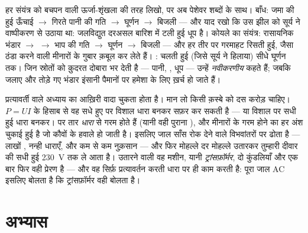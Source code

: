 \begin{example}[शृंखलाओं का लेखा]\label{ex:g9:alternator:chains}
हर संयंत्र को बचपन वाली ऊर्जा-शृंखला की तरह लिखो, पर अब पेशेवर शब्दों
के साथ। बाँध: जमा की हुई ऊँचाई $\to$ गिरते पानी की गति $\to$ घूर्णन
$\to$ बिजली --- और याद रखो कि उस झील को सूर्य ने वाष्पीकरण से उठाया
था: जलविद्युत दरअसल बारिश में टली हुई धूप है। कोयले का संयंत्र:
रासायनिक भंडार $\to$  $\to$ भाप की गति $\to$ घूर्णन $\to$ बिजली
--- और हर तीर पर गरमाहट रिसती हुई, जैसा ठंडा करने वाली मीनारों के
गुबार क़बूल कर लेते हैं। : चलती हुई  (जिसे सूर्य ने हिलाया) सीधे
घूर्णन तक। जिन स्रोतों को क़ुदरत दोबारा भर देती है --- पानी, , धूप
--- उन्हें \emph{नवीकरणीय} कहते हैं; जबकि जलाए और तोड़े
गए भंडार इंसानी पैमानों पर हमेशा के लिए ख़र्च हो जाते हैं।
\end{example}

\begin{remark}[मीनारें चार लाख वोल्ट पर क्यों गुनगुनाती हैं]\label{rem:g9:alternator:transport}
प्रत्यावर्ती वाले अध्याय का आख़िरी वादा चुकता होता है। मान लो किसी
क़स्बे को दस करोड़  चाहिए। $P = U I$ के हिसाब से वह  सधे हुए
 पर विशाल धारा बनकर सफ़र कर सकती है --- या विशाल  पर
सधी हुई धारा बनकर। पर तार \emph{धारा} से गरम होते हैं (यानी वही पुराना
), और मीनारों के गरम होने का हर अंश चुकाई हुई  है जो
कौवों के हवाले हो जाती है। इसलिए जाल साँस रोक देने वाले विभवांतरों पर
ढोता है --- लाखों , नन्ही धाराएँ, और कम से कम नुक़सान --- और फिर
मोहल्ले दर मोहल्ले  उतारकर तुम्हारी दीवार की सधी हुई
\qty{230}{V} तक ले आता है। उतारने वाली वह मशीन, यानी
\emph{ट्रांसफ़ॉर्मर}, दो कुंडलियाँ और एक बार फिर वही प्रेरण है --- और
वह सिर्फ़ प्रत्यावर्तन करती धारा पर ही काम करती है: पूरा जाल AC इसलिए
बोलता है कि ट्रांसफ़ॉर्मर वही बोलता है।
\end{remark}

\section{अभ्यास}

